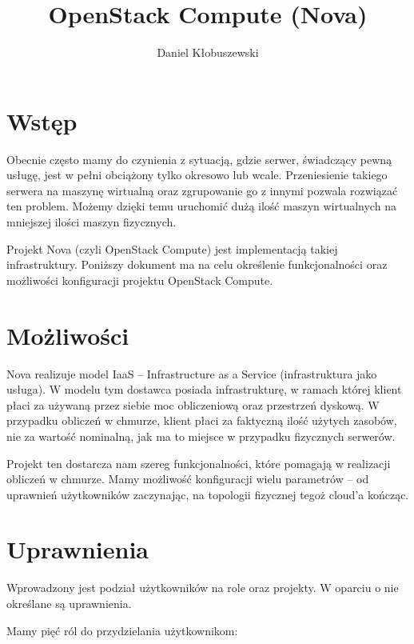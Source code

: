 

\usepackage{microtype}

\title{OpenStack Compute (Nova)\\[1em]
\large \sc {}}
\author{Daniel Kłobuszewski}


\maketitle

\section{Wstęp}
Obecnie często mamy do czynienia z sytuacją, gdzie serwer, świadczący pewną usługę, jest w pełni obciążony tylko okresowo lub wcale. Przeniesienie takiego serwera na maszynę wirtualną oraz zgrupowanie go z innymi pozwala rozwiązać ten problem. Możemy dzięki temu uruchomić dużą ilość maszyn wirtualnych na mniejszej ilości maszyn fizycznych.

Projekt Nova (czyli OpenStack Compute) jest implementacją takiej infrastruktury. Poniższy dokument ma na celu określenie funkcjonalności oraz możliwości konfiguracji projektu OpenStack Compute.

\section{Możliwości}
Nova realizuje model IaaS -- Infrastructure as a Service (infrastruktura jako usługa). W modelu tym dostawca posiada infrastrukturę, w ramach której klient płaci za używaną przez siebie moc obliczeniową oraz przestrzeń dyskową. W przypadku obliczeń w chmurze, klient płaci za faktyczną ilość użytych zasobów\cite{hansen11}, nie za wartość nominalną, jak ma to miejsce w przypadku fizycznych serwerów. 

Projekt ten dostarcza nam szereg funkcjonalności, które pomagają w realizacji obliczeń w chmurze. Mamy możliwość konfiguracji wielu parametrów -- od uprawnień użytkowników zaczynając, na topologii fizycznej tegoż cloud'a kończąc.

\section{Uprawnienia}

Wprowadzony jest podział użytkowników na role oraz projekty. W oparciu o nie określane są uprawnienia.

Mamy pięć ról do przydzielania użytkownikom\cite{nova_manual}:

